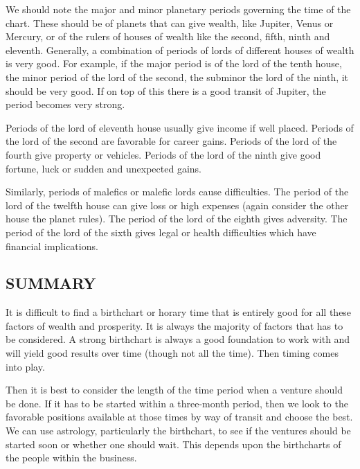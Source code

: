  

We should note the major and minor planetary periods governing the time of the chart. These should be of planets that can give wealth, like Jupiter, Venus or Mercury, or of the rulers of houses of wealth like the second, fifth, ninth and eleventh. Generally, a combination of periods of lords of different houses of wealth is very good. For example, if the major period is of the lord of the tenth house, the minor period of the lord of the second, the subminor the lord of the ninth, it should be very good. If on top of this there is a good transit of Jupiter, the period becomes very strong.

 

Periods of the lord of eleventh house usually give income if well placed. Periods of the lord of the second are favorable for career gains. Periods of the lord of the fourth give property or vehicles. Periods of the lord of the ninth give good fortune, luck or sudden and unexpected gains.

 

Similarly, periods of malefics or malefic lords cause difficulties. The period of the lord of the twelfth house can give loss or high expenses (again consider the other house the planet rules). The period of the lord of the eighth gives adversity. The period of the lord of the sixth gives legal or health difficulties which have financial implications.

 

\subsection{SUMMARY}

 

It is difficult to find a birthchart or horary time that is entirely good for all these factors of wealth and prosperity. It is always the majority of factors that has to be considered. A strong birthchart is always a good foundation to work with and will yield good results over time (though not all the time). Then timing comes into play.

 

Then it is best to consider the length of the time period when a venture should be done. If it has to be started within a three-month period, then we look to the favorable positions available at those times by way of transit and choose the best. We can use astrology, particularly the birthchart, to see if the ventures should be started soon or whether one should wait. This depends upon the birthcharts of the people within the business.